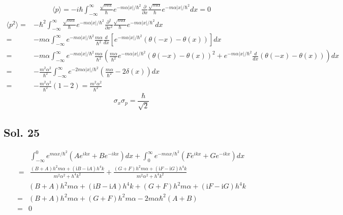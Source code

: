 \begin{align*}
    \langle p\rangle
    = -i\hbar\int_{-\infty}^{\infty}
    \frac{\sqrt{m\alpha}}{\hbar}
    e^{-m\alpha|x|/\hbar^2} \frac{\partial}{\partial x}
    \frac{\sqrt{m\alpha}}{\hbar}
    e^{-m\alpha|x|/\hbar^2}
    dx = 0
\end{align*}
\begin{align*}
    \langle p^2\rangle
    =& -\hbar^2\int_{-\infty}^{\infty}
    \frac{\sqrt{m\alpha}}{\hbar}
    e^{-m\alpha|x|/\hbar^2} \frac{\partial^2}{\partial x^2}
    \frac{\sqrt{m\alpha}}{\hbar}
    e^{-m\alpha|x|/\hbar^2}
    dx \\
    =& -m\alpha
    \int_{-\infty}^{\infty}
     e^{-m\alpha|x|/\hbar^2}
     \frac{m\alpha}{\hbar^2}
     \frac{d}{dx}[e^{-m\alpha|x|/\hbar^2}(\theta(-x)-\theta(x))]dx\\
     =&-m\alpha\int_{-\infty}^{\infty}
     e^{-m\alpha|x|/\hbar^2}
     \frac{m\alpha}{\hbar^2}
     (\frac{m\alpha}{\hbar^2}
     e^{-m\alpha|x|/\hbar^2}(\theta(-x)-\theta(x))^2
     +e^{-m\alpha|x|/\hbar^2}\frac{d}{dx}
     (\theta(-x)-\theta(x))
     )dx\\
     =&-\frac{m^2\alpha^2}{\hbar^2}
     \int_{-\infty}^{\infty}
     e^{-2m\alpha|x|/\hbar^2}
     (\frac{m\alpha}{\hbar^2}-2\delta(x))dx\\
     =&-\frac{m^2\alpha^2}{\hbar^2}
     (1-2)=\frac{m^2\alpha^2}{\hbar^2}
\end{align*}
$$
\sigma_x\sigma_p
=\frac{\hbar}{\sqrt{2}}
$$

\subsection*{Sol. 25}
\begin{align*}
    & \int_{-\infty}^{0}
    e^{m\alpha x/\hbar^2}
    (Ae^{ikx} + Be^{-ikx})dx
    +
    \int_{0}^{\infty}
    e^{-m\alpha x/\hbar^2}
    (Fe^{ikx} + Ge^{-ikx})dx
    \\= & 
    \frac{\left(B + A\right) h^{2} m{\alpha} + \left(\mathrm{i}B - \mathrm{i}A\right) h^{4} k}{m^{2} {\alpha}^{2} + h^{4} k^{2}} + 
    \frac{\left(G + F\right) h^{2} m{\alpha} + \left(\mathrm{i}F - \mathrm{i}G\right) h^{4} k}{m^{2} {\alpha}^{2} + h^{4} k^{2}}
\end{align*}
\begin{align*}
     & \left(B + A\right) h^{2} m{\alpha} 
     + \left(\mathrm{i}B - \mathrm{i}A\right) h^{4} k + 
    \left(G + F\right) h^{2} m{\alpha} + \left(\mathrm{i}F - \mathrm{i}G\right) h^{4} k\\
    = & 
    \left(B + A\right) h^{2} m{\alpha} +
    \left(G + F\right) h^{2} m{\alpha}
    -2m\alpha\hbar^2(A+B)\\
    = & 0
\end{align*}

